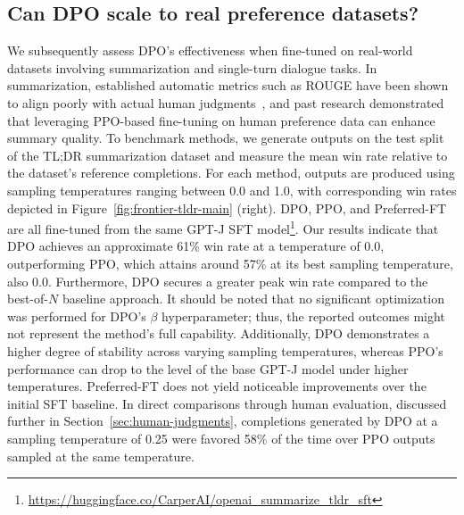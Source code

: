 \subsection{Can DPO scale to real preference datasets?}
\label{sec:dpo-real-datasets}
We subsequently assess DPO's effectiveness when fine-tuned on real-world datasets involving summarization and single-turn dialogue tasks. In summarization, established automatic metrics such as ROUGE have been shown to align poorly with actual human judgments~\citep{stiennon2022learning}, and past research demonstrated that leveraging PPO-based fine-tuning on human preference data can enhance summary quality. To benchmark methods, we generate outputs on the test split of the TL;DR summarization dataset and measure the mean win rate relative to the dataset's reference completions. For each method, outputs are produced using sampling temperatures ranging between 0.0 and 1.0, with corresponding win rates depicted in Figure~\ref{fig:frontier-tldr-main} (right). DPO, PPO, and Preferred-FT are all fine-tuned from the same GPT-J SFT model\footnote{\url{https://huggingface.co/CarperAI/openai_summarize_tldr_sft}}. Our results indicate that DPO achieves an approximate 61\% win rate at a temperature of 0.0, outperforming PPO, which attains around 57\% at its best sampling temperature, also 0.0. Furthermore, DPO secures a greater peak win rate compared to the best-of-$N$ baseline approach. It should be noted that no significant optimization was performed for DPO’s $\beta$ hyperparameter; thus, the reported outcomes might not represent the method’s full capability. Additionally, DPO demonstrates a higher degree of stability across varying sampling temperatures, whereas PPO’s performance can drop to the level of the base GPT-J model under higher temperatures. Preferred-FT does not yield noticeable improvements over the initial SFT baseline. In direct comparisons through human evaluation, discussed further in Section~\ref{sec:human-judgments}, completions generated by DPO at a sampling temperature of 0.25 were favored 58\% of the time over PPO outputs sampled at the same temperature.


